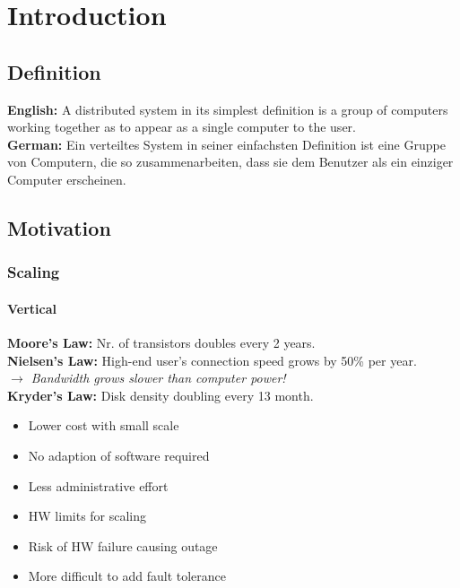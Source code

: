 

\section{Introduction}


\subsection{Definition}
\textbf{English:} A distributed system in its simplest definition is a group of computers working together as to appear as a single computer to the user.\\
\textbf{German:} Ein verteiltes System in seiner einfachsten Definition ist eine Gruppe von Computern, die so zusammenarbeiten, dass sie dem Benutzer als ein einziger Computer erscheinen.

\subsection{Motivation}

\subsubsection{Scaling}
\paragraph{Vertical}
\textbf{Moore's Law: }Nr. of transistors doubles every 2 years.\\
\textbf{Nielsen's Law:} High-end user's connection speed grows by 50\% per year.\\
\textit{$\rightarrow$ Bandwidth grows slower than computer power!}\\
\textbf{Kryder's Law:} Disk density doubling every 13 month.
\begin{itemize}[label={\textcolor{ForestGreen}{+}}]
    \item Lower cost with small scale
    \item No adaption of software required
    \item Less administrative effort
\end{itemize}
\begin{itemize}[label={\textcolor{red}{--}}]
    \item HW limits for scaling
    \item Risk of HW failure causing outage
    \item More difficult to add fault tolerance
\end{itemize}
